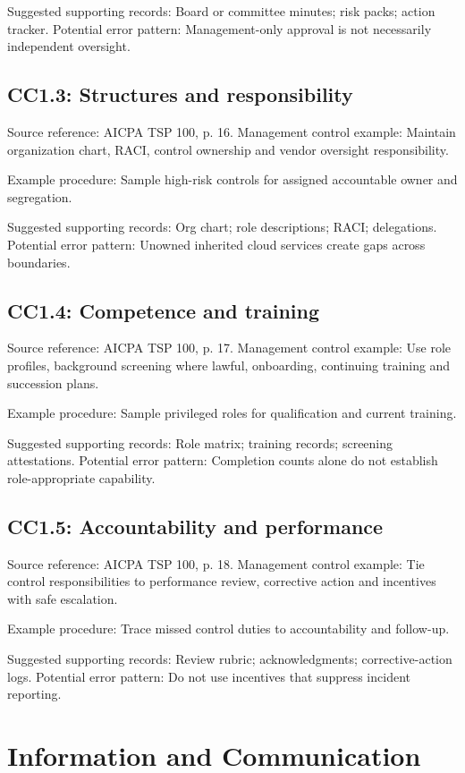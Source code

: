 \documentclass[10pt,oneside]{report}
\begin{document}
Suggested supporting records: Board or committee minutes; risk packs; action tracker. Potential error pattern: Management-only approval is not necessarily independent oversight.

\subsection*{CC1.3: Structures and responsibility}
Source reference: AICPA TSP 100, p. 16. Management control example: Maintain organization chart, RACI, control ownership and vendor oversight responsibility.

Example procedure: Sample high-risk controls for assigned accountable owner and segregation.

Suggested supporting records: Org chart; role descriptions; RACI; delegations. Potential error pattern: Unowned inherited cloud services create gaps across boundaries.

\subsection*{CC1.4: Competence and training}
Source reference: AICPA TSP 100, p. 17. Management control example: Use role profiles, background screening where lawful, onboarding, continuing training and succession plans.

Example procedure: Sample privileged roles for qualification and current training.

Suggested supporting records: Role matrix; training records; screening attestations. Potential error pattern: Completion counts alone do not establish role-appropriate capability.

\subsection*{CC1.5: Accountability and performance}
Source reference: AICPA TSP 100, p. 18. Management control example: Tie control responsibilities to performance review, corrective action and incentives with safe escalation.

Example procedure: Trace missed control duties to accountability and follow-up.

Suggested supporting records: Review rubric; acknowledgments; corrective-action logs. Potential error pattern: Do not use incentives that suppress incident reporting.

\section{Information and Communication}
\end{document}

